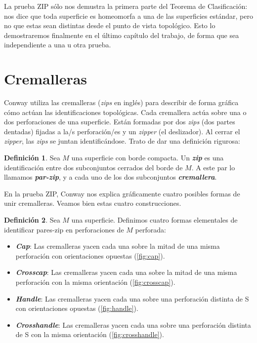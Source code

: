 \documentclass[10pt]{report}
\newcommand{\enfatiza}[1]{\textbf{\textit{#1}}}
\theoremstyle{definition}
\newtheorem{defin}{Definición}[section]
\begin{document}
La prueba ZIP sólo nos demustra la primera parte del Teorema de Clasificación: nos dice que toda superficie es homeomorfa a una de las superficies estándar, pero no que estas sean distintas desde el punto de vista topológico. Esto lo demostraremos finalmente en el último capítulo del trabajo, de forma que sea independiente a una u otra prueba.

\section{Cremalleras}


Conway utiliza las cremalleras (\textit{zips} en inglés) para describir de forma gráfica cómo actúan las identificaciones topológicas. Cada cremallera actúa sobre una o dos perforaciones de una superficie. Están formadas por dos \textit{zips} (dos partes dentadas) fijadas a la/s perforación/es y un \textit{zipper} (el deslizador). Al cerrar el \textit{zipper}, las \textit{zips} se juntan identificándose. Trato de dar una definición rigurosa:


\begin{defin}%
Sea $M$ una superficie con borde compacta. Un \enfatiza{zip} es una identificación entre dos subconjuntos cerrados del borde de $M$. A este par lo llamamos \enfatiza{par-zip}, y a cada uno de los dos subconjuntos \enfatiza{cremallera}.
\end{defin}


En la prueba ZIP, Conway nos explica gráficamente cuatro posibles formas de unir cremalleras. Veamos bien estas cuatro construcciones.

\begin{defin}
Sea $M$ una superficie. Definimos cuatro formas elementales de identificar pares-zip en perforaciones de 
$M$ perforada:

\begin{itemize}
\item[1.] \enfatiza{Cap}: Las cremalleras yacen cada una sobre la mitad de una misma perforación con orientaciones opuestas (\autoref{fig:cap}).
\item[2.] \enfatiza{Crosscap}: Las cremalleras yacen cada una sobre la mitad de una misma perforación con la misma orientación (\autoref{fig:crosscap}).
\item[3.] \enfatiza{Handle}: Las cremalleras yacen cada una sobre una perforación distinta de S con orientaciones opuestas (\autoref{fig:handle}).
\item[4.] \enfatiza{Crosshandle}: Las cremalleras yacen cada una sobre una perforación distinta de S con la misma orientación (\autoref{fig:crosshandle}).
\end{itemize}
\end{defin}
\end{document}
